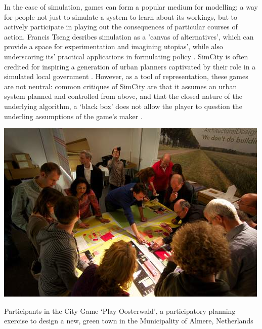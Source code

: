 \documentclass[nofonts,nols,justified,nobib]{tufte-book}
\begin{document}
In the case of simulation, games can form a popular medium for modelling: a way for people not just to simulate a system to learn about its workings, but to actively participate in playing out the consequences of particular courses of action. Francis Tseng desribes simulation as a 'canvas of alternatives', which can provide a space for experimentation and imagining utopias', while also underscoring its' practical applications in formulating policy \cite{tseng_simulation_2018}. SimCity is often credited for inspiring a generation of urban planners captivated by their role in a simulated local government \cite{roy_video_2019}. However, as a tool of representation, these games are not neutral: common critiques of SimCity are that it assumes an urban system planned and controlled from above, and that the closed nature of the underlying algorithm, a `black box' does not allow the player to question the underling assumptions of the game's maker \cite{starr_seductions_1994}.

\begin{marginfigure}
\includegraphics[width=\textwidth]{img/1/play-oosterwald.jpg}
\caption{Participants in the City Game `Play Oosterwald', a participatory planning exercise to design a new, green town in the Municipality of Almere, Netherlands \cite{play_the_city_play_2013}}
\end{marginfigure}
\end{document}
